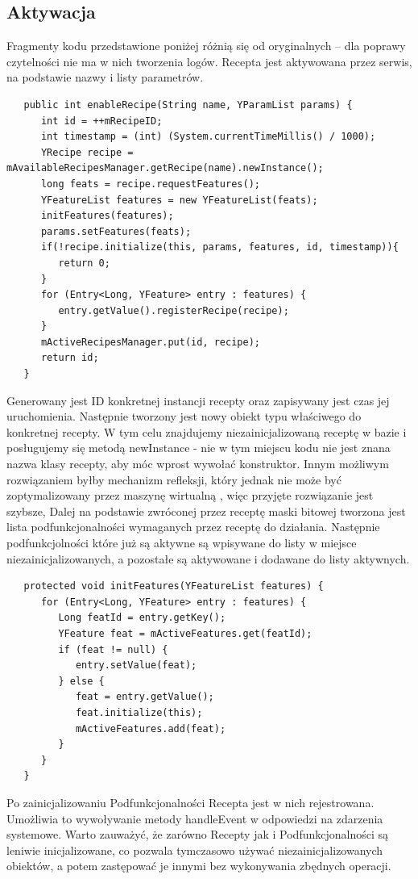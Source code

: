 \documentclass[11pt,a4paper,polish,thesis]{dcsbook}
\begin{document}
\subsection{Aktywacja}
Fragmenty kodu przedstawione poniżej różnią się od oryginalnych -- dla poprawy czytelności nie ma w nich tworzenia logów.
Recepta jest aktywowana przez serwis, na podstawie nazwy i listy parametrów.
\begin{verbatim}
   public int enableRecipe(String name, YParamList params) {
      int id = ++mRecipeID;
      int timestamp = (int) (System.currentTimeMillis() / 1000);
      YRecipe recipe = mAvailableRecipesManager.getRecipe(name).newInstance();
      long feats = recipe.requestFeatures();
      YFeatureList features = new YFeatureList(feats);
      initFeatures(features);
      params.setFeatures(feats);
      if(!recipe.initialize(this, params, features, id, timestamp)){
         return 0;
      }
      for (Entry<Long, YFeature> entry : features) {
         entry.getValue().registerRecipe(recipe);
      }
      mActiveRecipesManager.put(id, recipe);
      return id;
   }
\end{verbatim}
Generowany jest ID konkretnej instancji recepty oraz zapisywany jest czas jej uruchomienia.
Następnie tworzony jest nowy obiekt typu właściwego do konkretnej recepty. W tym celu znajdujemy niezainicjalizowaną receptę w bazie i posługujemy się metodą newInstance - nie w tym miejscu kodu nie jest znana nazwa klasy recepty, aby móc wprost wywołać konstruktor. Innym możliwym rozwiązaniem byłby mechanizm refleksji, który jednak nie może być zoptymalizowany przez maszynę wirtualną \cite{java}, więc przyjęte rozwiązanie jest szybsze, 
Dalej na podstawie zwróconej przez receptę maski bitowej tworzona jest lista podfunkcjonalności wymaganych przez receptę do działania. Następnie podfunkcjolności które już są aktywne są wpisywane do listy w miejsce niezainicjalizowanych, a pozostałe są aktywowane i dodawane do listy aktywnych.

\begin{verbatim}
   protected void initFeatures(YFeatureList features) {
      for (Entry<Long, YFeature> entry : features) {
         Long featId = entry.getKey();
         YFeature feat = mActiveFeatures.get(featId);
         if (feat != null) {
            entry.setValue(feat);
         } else {
            feat = entry.getValue();
            feat.initialize(this);
            mActiveFeatures.add(feat);
         }
      }
   }
\end{verbatim}
Po zainicjalizowaniu Podfunkcjonalności Recepta jest w nich rejestrowana. Umożliwia to wywoływanie metody handleEvent w odpowiedzi na zdarzenia systemowe. 
Warto zauważyć, że zarówno Recepty jak i Podfunkcjonalności są leniwie inicjalizowane, co pozwala tymczasowo używać niezainicjalizowanych obiektów, a potem zastępować je innymi bez wykonywania zbędnych operacji. 
\end{document}
